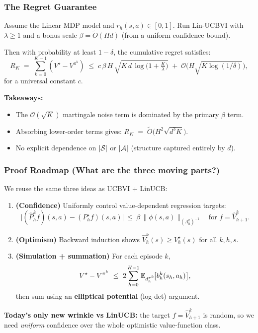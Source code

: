 \documentclass[aspectratio=169]{beamer}
\begin{document}
\begin{frame}\frametitle{The Regret Guarantee}

\small
\begin{theorem}
Assume the Linear MDP model and $r_h(s,a)\in[0,1]$. Run Lin-UCBVI with $\lambda\ge 1$ and
a bonus scale $\beta=\widetilde O(Hd)$ (from a uniform confidence bound).

Then with probability at least $1-\delta$, the cumulative regret satisfies:
\[
R_K \;=\; \sum_{k=0}^{K-1} \left(V^\star - V^{\pi^k}\right)
\;\le\;
c\,\beta\,H\,\sqrt{K\,d\,\log\!\Big(1+\tfrac{K}{\lambda}\Big)}
\;+\;
\mathcal{O}\Big(H\sqrt{K\log(1/\delta)}\Big),
\]
for a universal constant $c$.
\end{theorem}

\vspace{0.15cm}
\pause
\textbf{Takeaways:}
\begin{itemize}
  \item The $\mathcal{O}(\sqrt{K})$ martingale noise term is dominated by the primary $\beta$ term.
  \item Absorbing lower-order terms gives: $R_K \;=\; \widetilde O\!\Big(H^2\sqrt{d^3K}\Big)$.
  \item No explicit dependence on $|\mathcal{S}|$ or $|\mathcal{A}|$ (structure captured entirely by $d$).
\end{itemize}

\end{frame}


\begin{frame}\frametitle{Proof Roadmap (What are the three moving parts?)}

\small
We reuse the same three ideas as UCBVI + LinUCB:

\vspace{0.10cm}
\begin{enumerate}
\item \textbf{(Confidence)} \quad
Uniformly control value-dependent regression targets:
\[
\big|(\widehat P_h^k f)(s,a)-(P_h^\star f)(s,a)\big|
\ \le\ \beta\,\|\phi(s,a)\|_{(\Lambda_h^k)^{-1}}
\quad \text{for } f=\widehat V_{h+1}^k.
\]
\pause
\item \textbf{(Optimism)} \quad
Backward induction shows $\widehat V_h^k(s)\ge V_h^\star(s)$ for all $k,h,s$.
\pause
\item \textbf{(Simulation + summation)} \quad
For each episode $k$,
\[
V^\star - V^{\pi^k}\ \le\ 2\sum_{h=0}^{H-1}\E_{d_h^{\pi^k}}\!\big[b_h^k(s_h,a_h)\big],
\]
then sum using an \textbf{elliptical potential} (log-det) argument.
\end{enumerate}

\vspace{0.10cm}
\pause
\textbf{Today’s only new wrinkle vs LinUCB:} the target $f=\widehat V_{h+1}^k$ is random, so we need
\emph{uniform} confidence over the whole optimistic value-function class.

\end{frame}
\end{document}
